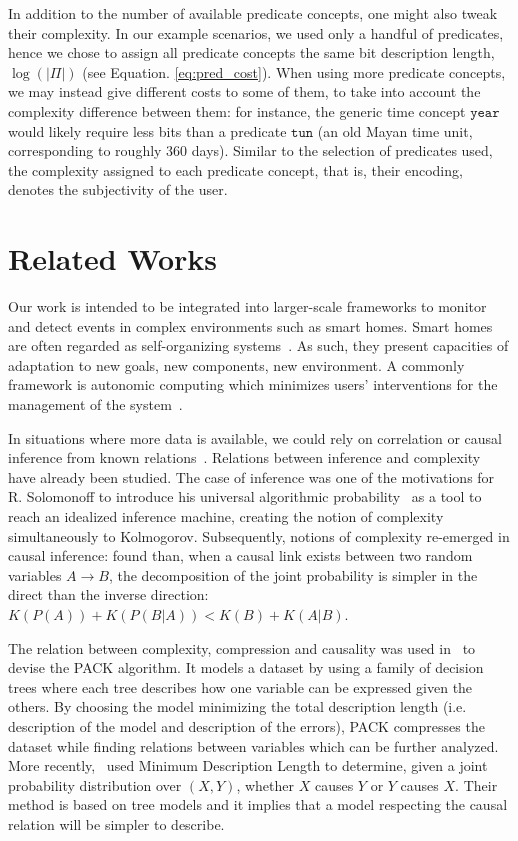 \documentclass[entropy,article,submit,moreauthors,pdftex]{Definitions/mdpi}
\begin{document}
In addition to the number of available predicate concepts, one might also tweak their complexity. In our example scenarios, we used only a handful of predicates, hence we chose to assign all predicate concepts the same bit description length, $\log(|\Pi|)$ (see Equation. \ref{eq:pred_cost}). When using more predicate concepts, we may instead give different costs to some of them, to take into account the complexity difference between them: for instance, the generic time concept $\texttt{year}$ would likely require less bits than a predicate $\texttt{tun}$ (an old Mayan time unit, corresponding to roughly 360 days). Similar to the selection of predicates used, the complexity assigned to each predicate concept, that is, their encoding, denotes the subjectivity of the user.

\section{Related Works}
\label{sec:related}
Our work is intended to be integrated into larger-scale frameworks to monitor
and detect events in complex environments such as smart homes. Smart homes are often regarded as self-organizing systems~\cite{kramer_rigorous_2009,kounev_notion_2017}. As such, they present capacities of adaptation to new goals,
new components, new environment. A commonly framework is 
autonomic computing which minimizes users' interventions for the management of the
system~\cite{kounev_notion_2017,kephart_vision_2003}.

In situations where more data is available, we could rely
on correlation or causal inference from known relations~\cite{peters_elements_2017,fadiga_or_2021}. Relations between inference and complexity have already been studied. The
case of inference was one of the motivations for R. Solomonoff to introduce his
universal algorithmic probability~\cite{solomonoff_formal_1964} as a tool to
reach an idealized inference machine, creating the notion of complexity simultaneously
to Kolmogorov. Subsequently, notions of complexity re-emerged in causal inference:
\cite{janzing_causal_2010} found than, when a causal link exists between two random variables $A \rightarrow B$, the decomposition of the joint probability is simpler in the direct than the inverse direction: $K(P(A)) + K(P(B|A)) < K(B) + K(A|B)$.

The relation between complexity, compression and causality was used in~\cite{tatti_finding_2008} to devise the PACK algorithm. It models a dataset by using a family of decision trees where each tree describes how one variable can be expressed given the others. By choosing the model minimizing the total description length (i.e. description of the model and description of the errors), PACK compresses the dataset while finding relations between variables which can be further analyzed. More recently,~\cite{marx_causal_2018} used Minimum Description Length to determine, given a joint probability distribution over $(X,Y)$, whether $X$ causes $Y$ or $Y$ causes $X$. Their method is based on tree models and it implies that a model respecting the causal relation will be simpler to describe.
\end{document}
